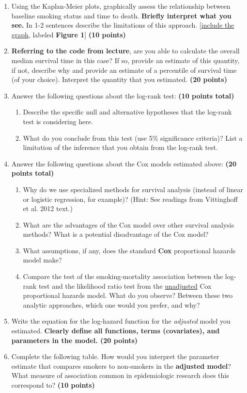 \documentclass{article}\usepackage[]{graphicx}\usepackage[]{color}
\begin{document}
\begin{enumerate}
  \item Using the Kaplan-Meier plots, graphically assess the relationship between baseline smoking status and time to death. \textbf{Briefly interpret what you see.} In 1-2 sentences describe the limitations of this approach. [{\ul{include the graph}}, labeled \textbf{Figure 1}] \textbf{(10 points)}
  \item \textbf{Referring to the code from lecture}, are you able to calculate the overall median survival time in this case? If so, provide an estimate of this quantity, if not, describe why and provide an estimate of a percentile of survival time (of your choice). Interpret the quantity that you estimated. \textbf{(20 points)}
  \item Answer the following questions about the log-rank test: \textbf{(10 points total)}
  \begin{enumerate}
    \item Describe the specific null and alternative hypotheses that the log-rank test is considering here.
    \item What do you conclude from this test (use 5\% significance criteria)? List a limitation of the inference that you obtain from the log-rank test.
  \end{enumerate}
\item Answer the following questions about the Cox models estimated above: \textbf{(20 points total)}
  \begin{enumerate}
    \item Why do we use specialized methods for survival analysis (instead of linear or logistic regression, for example)? (Hint: See readings from Vittinghoff et al. 2012 text.)
    \item What are the advantages of the Cox model over other survival analysis methods? What is a potential disadvantage of the Cox model?
    \item What assumptions, if any, does the standard \textbf{Cox} proportional hazards model make?
    \item Compare the test of the smoking-mortality association between the log-rank test and the likelihood ratio test from the \ul{unadjusted} Cox proportional hazards model. What do you observe? Between these two analytic approaches, which one would you prefer, and why?
  \end{enumerate}
  \item Write the equation for the log-hazard function for the \textit{adjusted} model you estimated. \textbf{Clearly define all functions, terms (covariates), and parameters in the model. (20 points)}
  \item Complete the following table. How would you interpret the parameter estimate that compares smokers to non-smokers in the \textbf{adjusted model}? What measure of association common in epidemiologic research does this correspond to? \textbf{(10 points)}





\end{enumerate}
\end{document}
